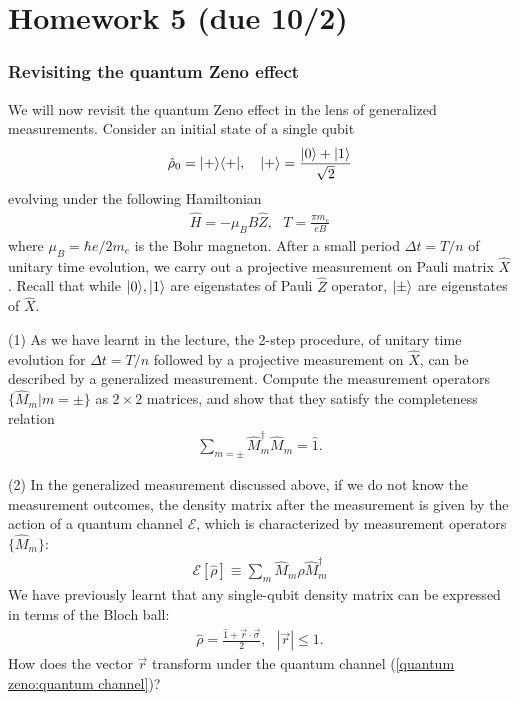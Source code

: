 \chapter{Homework 5 (due 10/2)}


\subsection{Revisiting the quantum Zeno effect}

We will now revisit the quantum Zeno effect in the lens of generalized measurements. Consider an initial state of a single qubit 
\begin{align}\label{quantum zeno:initial state}
\hat{\rho}_0=|{+}\rangle\langle{+}|,~~~|{+}\rangle=\frac{|{0}\rangle+|{1}\rangle}{\sqrt2}
\end{align}
evolving under the following Hamiltonian
\begin{align}
\hat H=-\mu_BB\hat Z,~~~T=\frac{\pi m_e}{eB}
\end{align}
where $\mu_B=\hbar e/2m_e$ is the Bohr magneton. After a small period $\Delta t=T/n$ of unitary time evolution, we carry out a projective measurement on Pauli matrix $\hat X$. Recall that while $|{0}\rangle,|{1}\rangle$ are eigenstates of Pauli $\hat Z$ operator, $|{\pm}\rangle$ are eigenstates of $\hat X$.  

(1) As we have learnt in the lecture, the 2-step procedure, of unitary time evolution for $\Delta t=T/n$ followed by a projective measurement on $\hat X$, can be described by a generalized measurement. Compute the measurement operators $\{\hat M_m|m=\pm\}$ as $2\times2$ matrices, and show that they satisfy the completeness relation
\begin{align}
\sum_{m=\pm}\hat M^\dagger_m\hat M_m=\hat1. 
\end{align}

(2) In the generalized measurement discussed above, if we do not know the measurement outcomes, the density matrix after the measurement is given by the action of a quantum channel $\mathcal{E}$, which is characterized by measurement operators $\{\hat M_m\}$:
\begin{align}\label{quantum zeno:quantum channel}
\mathcal{E}[\hat\rho]\equiv\sum_m\hat M_m\hat\rho\hat M_m^\dagger
\end{align}
We have previously learnt that any single-qubit density matrix can be expressed in terms of the Bloch ball:
\begin{align}
\hat\rho=\frac{\hat 1+\vec r\cdot\vec\sigma}2,~~~|\vec r|\leq1.
\end{align}
How does the vector $\vec r$ transform under the quantum channel (\ref{quantum zeno:quantum channel})?

